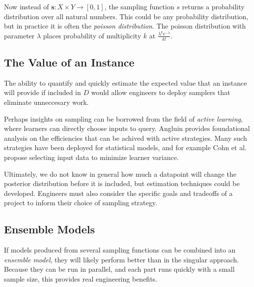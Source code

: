 \documentclass[twoside]{article}
\begin{document}
Now instead of \(\mathbf{s}: X \times Y \rightarrow \left [ 0, 1\right ]\), the sampling function \(s\) returns a probability distribution over all natural numbers. This could be any probability distribution, but in practice it is often the \textit{poisson distribution}. The poisson distribution with parameter \(\lambda\) places probability of multiplicity \(k\) at \(\frac{\lambda^k e^{-\lambda}}{k!}\).

\subsection{The Value of an Instance}

The ability to quantify and quickly estimate the expected value that an instance will provide if included in \(D\) would allow engineers to deploy samplers that eliminate unneccesary work.

Perhaps insights on sampling can be borrowed from the field of \textit{active learning}, where learners can directly choose inputs to query. Angluin\cite{angluin} provides foundational analysis on the efficiencies that can be achived with active strategies. Many such strategies have been deployed for statistical models, and for example Cohn et al.\cite{active} propose selecting input data to minimize learner variance.

Ultimately, we do not know in general how much a datapoint will change the posterior distribution before it is included, but estimation techniques could be developed. Engineers must also consider the specific goals and tradeoffs of a project to inform their choice of sampling strategy. 

\subsection{Ensemble Models}

If models produced from several sampling functions can be combined into an \textit{ensemble model}, they will likely perform better than in the singular approach. Because they can be run in parallel, and each part runs quickly with a small sample size, this provides real engineering benefits.
\end{document}
